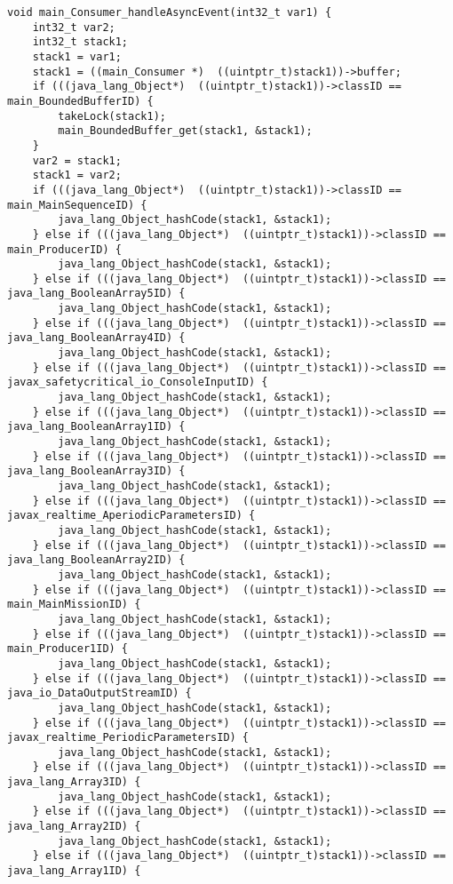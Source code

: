 \begin{landscape}
\begin{multicols}{2}
\begin{lstlisting}[firstnumber=380]
void main_Consumer_handleAsyncEvent(int32_t var1) {
	int32_t var2;
	int32_t stack1;
	stack1 = var1;
	stack1 = ((main_Consumer *)  ((uintptr_t)stack1))->buffer;
	if (((java_lang_Object*)  ((uintptr_t)stack1))->classID == main_BoundedBufferID) {
		takeLock(stack1);
		main_BoundedBuffer_get(stack1, &stack1);
	}
	var2 = stack1;
	stack1 = var2;
	if (((java_lang_Object*)  ((uintptr_t)stack1))->classID == main_MainSequenceID) {
		java_lang_Object_hashCode(stack1, &stack1);
	} else if (((java_lang_Object*)  ((uintptr_t)stack1))->classID == main_ProducerID) {
		java_lang_Object_hashCode(stack1, &stack1);
	} else if (((java_lang_Object*)  ((uintptr_t)stack1))->classID == java_lang_BooleanArray5ID) {
		java_lang_Object_hashCode(stack1, &stack1);
	} else if (((java_lang_Object*)  ((uintptr_t)stack1))->classID == java_lang_BooleanArray4ID) {
		java_lang_Object_hashCode(stack1, &stack1);
	} else if (((java_lang_Object*)  ((uintptr_t)stack1))->classID == javax_safetycritical_io_ConsoleInputID) {
		java_lang_Object_hashCode(stack1, &stack1);
	} else if (((java_lang_Object*)  ((uintptr_t)stack1))->classID == java_lang_BooleanArray1ID) {
		java_lang_Object_hashCode(stack1, &stack1);
	} else if (((java_lang_Object*)  ((uintptr_t)stack1))->classID == java_lang_BooleanArray3ID) {
		java_lang_Object_hashCode(stack1, &stack1);
	} else if (((java_lang_Object*)  ((uintptr_t)stack1))->classID == javax_realtime_AperiodicParametersID) {
		java_lang_Object_hashCode(stack1, &stack1);
	} else if (((java_lang_Object*)  ((uintptr_t)stack1))->classID == java_lang_BooleanArray2ID) {
		java_lang_Object_hashCode(stack1, &stack1);
	} else if (((java_lang_Object*)  ((uintptr_t)stack1))->classID == main_MainMissionID) {
		java_lang_Object_hashCode(stack1, &stack1);
	} else if (((java_lang_Object*)  ((uintptr_t)stack1))->classID == main_Producer1ID) {
		java_lang_Object_hashCode(stack1, &stack1);
	} else if (((java_lang_Object*)  ((uintptr_t)stack1))->classID == java_io_DataOutputStreamID) {
		java_lang_Object_hashCode(stack1, &stack1);
	} else if (((java_lang_Object*)  ((uintptr_t)stack1))->classID == javax_realtime_PeriodicParametersID) {
		java_lang_Object_hashCode(stack1, &stack1);
	} else if (((java_lang_Object*)  ((uintptr_t)stack1))->classID == java_lang_Array3ID) {
		java_lang_Object_hashCode(stack1, &stack1);
	} else if (((java_lang_Object*)  ((uintptr_t)stack1))->classID == java_lang_Array2ID) {
		java_lang_Object_hashCode(stack1, &stack1);
	} else if (((java_lang_Object*)  ((uintptr_t)stack1))->classID == java_lang_Array1ID) {

\end{lstlisting}
\end{multicols}
\end{landscape}
